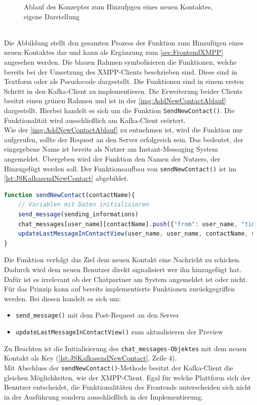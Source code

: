\documentclass[a4paper,titlepage,halfparskip,12pt]{scrreprt}
\begin{document}
\begin{onehalfspacing}
\begin{figure}[h]
	\caption{Ablauf des Konzeptes zum Hinzufpgen eines neuen Kontaktes, eigene Darstellung}
	\label{img:AddNewContactAblauf}
\end{figure}\\
Die Abbildung stellt den gesamten Prozess der Funktion zum Hinzufügen eines neuen Kontaktes dar und kann als Ergänzung zum \autoref{sec:FrontendXMPP} angesehen werden. Die blauen Rahmen symbolisieren die Funktionen, welche bereits bei der Umsetzung des XMPP-Clients beschrieben sind. Diese sind in Textform oder als Pseudocode dargestellt. Die Funktionen sind in einem ersten Schritt in den Kafka-Client zu implementieren. Die Erweiterung beider Clients besitzt einen grünen Rahmen und ist in der \autoref{img:AddNewContactAblauf} dargestellt. Hierbei handelt es sich um die Funktion \texttt{SendNewContact()}. Die Funktionalität wird ausschließlich am Kafka-Client erörtert.\\
Wie der \autoref{img:AddNewContactAblauf} zu entnehmen ist, wird die Funktion nur aufgerufen, sollte der Request an den Server erfolgreich sein. Das bedeutet, der eingegebene Name ist bereits als Nutzer am Instant-Messaging System angemeldet. Übergeben wird der Funktion den Namen der Nutzers, der Hinzugefügt werden soll. Der Funktionsaufbau von \texttt{sendNewContact()} ist im \autoref{lst:JSKafkasendNewContact} abgebildet.
\begin{lstlisting}[language=Javascript,caption=Funktionsaufbau von \texttt{sendNewContact()},label={lst:JSKafkasendNewContact}]
function sendNewContact(contactName){
	// Variablen mit Daten initialisieren
	send_message(sending_informations)
	chat_messages[user_name][contactName].push({"from": user_name, "timestamp": msg_timestamp, "txt": sending_informations.msg_body, "type": "chat"});
	updateLastMessageInContactView(user_name, user_name, contactName, sending_informations.msg_body)
}
\end{lstlisting}
Die Funktion verfolgt das Ziel dem neuen Kontakt eine Nachricht zu schicken. Dadurch wird dem neuen Benutzer direkt signalisiert wer ihn hinzugefügt hat. Dafür ist es irrelevant ob der Chatpartner am System angemeldet ist oder nicht. Für das Prinzip kann auf bereits implementierte Funktionen zurückgegriffen werden. Bei diesen handelt es sich um:
\begin{itemize}
	\item \texttt{send\_message()} mit dem Post-Request an den Server
	\item \texttt{updateLastMessageInContactView()} zum aktualisieren der Preview
\end{itemize}
Zu Beachten ist die Initialisierung des \texttt{chat\_messages-Objektes} mit dem neuen Kontakt als Key (\autoref{lst:JSKafkasendNewContact}, Zeile 4).\\
Mit Abschluss der \texttt{sendNewContact()}-Methode besitzt der Kafka-Client die gleichen Möglichkeiten, wie der XMPP-Client. Egal für welche Plattform sich der Benutzer entscheidet, die Funktionalitäten des Frontends unterscheiden sich nicht in der Ausführung sondern ausschließlich in der Implementierung.


\end{onehalfspacing}
\end{document}
